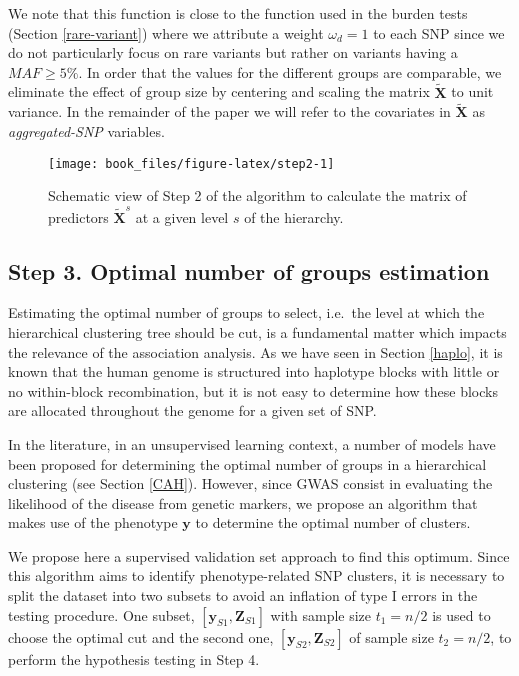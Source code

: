\documentclass[]{book}
\begin{document}
We note that this function is close to the function used in the burden
tests (Section \ref{rare-variant}) where we attribute a weight
\(\omega_d = 1\) to each SNP since we do not particularly focus on rare
variants but rather on variants having a \(MAF \geq 5\%\). In order that
the values for the different groups are comparable, we eliminate the
effect of group size by centering and scaling the matrix \(\tilde{\mathbf{X}}\)
to unit variance. In the remainder of the paper we will refer to the
covariates in \(\tilde{\mathbf{X}}\) as \emph{aggregated-SNP} variables.



\begin{figure}

{\centering \texttt{[image: book\_files/figure-latex/step2-1]} 

}

\caption{Schematic view of Step 2 of the algorithm to calculate the matrix of predictors \(\tilde{\mathbf{X}}^s\) at a given level \(s\) of the hierarchy.}\label{fig:step2}
\end{figure}

\hypertarget{cutree}{%
\subsection{Step 3. Optimal number of groups estimation}\label{cutree}}

Estimating the optimal number of groups to select, i.e.~the level at
which the hierarchical clustering tree should be cut, is a fundamental
matter which impacts the relevance of the association analysis. As we
have seen in Section \ref{haplo}, it is known that the human genome is
structured into haplotype blocks with little or no within-block
recombination, but it is not easy to determine how these blocks are
allocated throughout the genome for a given set of SNP.

In the literature, in an unsupervised learning context, a number of
models have been proposed for determining the optimal number of groups
in a hierarchical clustering (see Section \ref{CAH}). However, since
GWAS consist in evaluating the likelihood of the disease from genetic
markers, we propose an algorithm that makes use of the phenotype \(\mathbf{y}\)
to determine the optimal number of clusters.

We propose here a supervised validation set approach to find this
optimum. Since this algorithm aims to identify phenotype-related SNP
clusters, it is necessary to split the dataset into two subsets to avoid
an inflation of type I errors in the testing procedure. One subset,
\([\mathbf{y}_{S1}, \mathbf{Z}_{S1}]\) with sample size \(t_1 = n/2\) is used to choose
the optimal cut and the second one, \([\mathbf{y}_{S2}, \mathbf{Z}_{S2}]\) of sample
size \(t_2=n/2\), to perform the hypothesis testing in Step 4.
\end{document}
